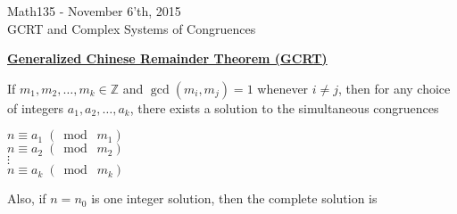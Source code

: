 \documentclass{letter}
\begin{document}
	\begin{center}
		\LARGE Math135 - November 6'th, 2015\\
		\large GCRT and Complex Systems of Congruences
	\end{center}
	\vspace{0.25 in}
	\underline{\textbf{Generalized Chinese Remainder Theorem (GCRT)}}
	
	If $m_1, m_2, \dots, m_k \in \mathbb{Z}$ and $\gcd(m_i, m_j) = 1$ whenever $i \not= j$, then for any choice of integers $a_1, a_2, \dots, a_k$, there exists a solution to the simultaneous congruences
	
	\begin{center}
		$n \equiv a_1 \;(\bmod\; m_1)$\\
		$n \equiv a_2 \;(\bmod\; m_2)$\\
		$\vdots$\\
		$n \equiv a_k \;(\bmod\; m_k)$
	\end{center}
	
	Also, if $n = n_0$ is one integer solution, then the complete solution is 
	
\end{document}
